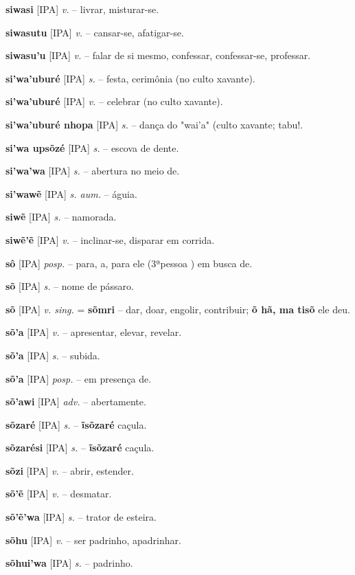 \textbf{siwasi} [IPA] \textit{v.} -- livrar, misturar-se.

\textbf{siwasutu} [IPA] \textit{v.} -- cansar-se, afatigar-se.

\textbf{siwasu'u} [IPA] \textit{v.} -- falar de si mesmo, confessar, confessar-se, professar.

\textbf{si'wa'uburé} [IPA] \textit{s.} -- festa, cerimônia (no culto xavante).

\textbf{si'wa'uburé} [IPA] \textit{v.} -- celebrar (no culto xavante).

\textbf{si'wa'uburé nhopa} [IPA] \textit{s.} -- dança do "wai'a" (culto xavante; tabu!.

\textbf{si'wa upsõzé} [IPA] \textit{s.} -- escova de dente.

\textbf{si'wa'wa} [IPA] \textit{s.} -- abertura no meio de.

\textbf{si'wawẽ} [IPA] \textit{s. aum.} -- águia.

\textbf{siwẽ} [IPA] \textit{s.} -- namorada.

\textbf{siwẽ'ẽ} [IPA] \textit{v.} -- inclinar-se, disparar em corrida.

\textbf{sô} [IPA] \textit{posp.} -- para, a, para ele (3ªpessoa ) em busca de.

\textbf{sõ} [IPA] \textit{s.} -- nome de pássaro.

\textbf{sõ} [IPA] \textit{v. sing.} = \textbf{sõmri} -- dar, doar, engolir, contribuir; \textbf{õ hã, ma tisõ} ele deu.

\textbf{sõ'a} [IPA] \textit{v.} -- apresentar, elevar, revelar.

\textbf{sõ'a} [IPA] \textit{s.} -- subida.

\textbf{sõ'a} [IPA] \textit{posp.} -- em presença de.

\textbf{sõ'awi} [IPA] \textit{adv.} -- abertamente.

\textbf{sõzaré} [IPA] \textit{s.} -- \textbf{ĩsõzaré} caçula.

\textbf{sõzarési} [IPA] \textit{s.} -- \textbf{ĩsõzaré} caçula.

\textbf{sõzi} [IPA] \textit{v.} -- abrir, estender.

\textbf{sõ'ẽ} [IPA] \textit{v.} -- desmatar.

\textbf{sõ'ẽ'wa} [IPA] \textit{s.} -- trator de esteira.

\textbf{sõhu} [IPA] \textit{v.} -- ser padrinho, apadrinhar.

\textbf{sõhui'wa} [IPA] \textit{s.} -- padrinho.


